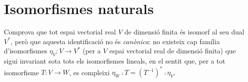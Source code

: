 \section{Isomorfismes naturals}

\begin{exercici}\label{ex:dual-no-natural}
Comprova que tot espai vectorial real $V$ de dimensió finita és isomorf al seu dual $V^*$, però que aquesta identificació no és \emph{canònica}: no existeix cap família d'isomorfismes $\eta_V\colon V\to V^*$ (per a $V$ espai vectorial real de dimensió finita) que sigui invariant sota tots els isomorfismes lineals, en el sentit que, per a tot isomorfisme $T\colon V\to W$, es compleixi $\eta_W\comp T=(T^{-1})^*\comp\eta_V$.
\end{exercici}

